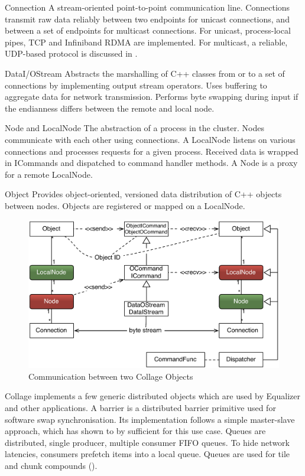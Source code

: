 \begin{compactdesc}
\item[Connection] A stream-oriented point-to-point communication
  line. Connections
  transmit raw data reliably between two endpoints for unicast connections, and
  between a set of endpoints for multicast connections. For unicast,
  process-local pipes, TCP and Infiniband RDMA are implemented. For multicast,
  a reliable, UDP-based protocol is discussed in .
\item[DataI/OStream] Abstracts the marshalling of C++ classes from or to
  a set of connections by implementing output stream operators. Uses buffering
  to aggregate data for network transmission. Performs byte swapping during
  input if the endianness differs between the remote and local node.
\item[Node and LocalNode] The abstraction of a process in the cluster. Nodes
  communicate with each other using connections. A LocalNode listens on various
  connections and processes requests for a given process. Received data is
  wrapped in ICommands and dispatched to command handler methods. A Node is a
  proxy for a remote LocalNode.
\item[Object] Provides object-oriented, versioned data distribution of C++
  objects between nodes. Objects are registered or mapped on a Local\-Node.
\end{compactdesc}

\begin{figure}[ht]\center
  \includegraphics[width=\columnwidth]{images/netObject}
  \caption{\label{fNetObject}Communication between two Collage Objects}
\end{figure}

\textsf{Collage} implements a few generic distributed objects which are used by
\textsf{Equalizer} and other applications. A barrier is a distributed barrier
primitive used for software swap synchronisation. Its implementation follows a
simple master-slave approach, which has shown to by sufficient for this use
case. Queues are distributed, single producer, multiple consumer FIFO queues. To
hide network latencies, consumers prefetch items into a local queue. Queues are
used for tile and chunk compounds ().

